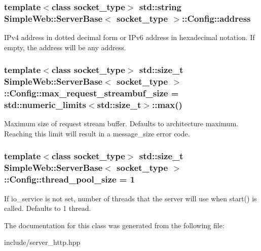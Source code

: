 \subsubsection[{\texorpdfstring{address}{address}}]{\setlength{\rightskip}{0pt plus 5cm}template$<$class socket\+\_\+type$>$ std\+::string {\bf Simple\+Web\+::\+Server\+Base}$<$ socket\+\_\+type $>$\+::Config\+::address}\hypertarget{classSimpleWeb_1_1ServerBase_1_1Config_add7a705aca3533bf0371708b19bb691c}{}\label{classSimpleWeb_1_1ServerBase_1_1Config_add7a705aca3533bf0371708b19bb691c}
I\+Pv4 address in dotted decimal form or I\+Pv6 address in hexadecimal notation. If empty, the address will be any address. 
\subsubsection[{\texorpdfstring{max\+\_\+request\+\_\+streambuf\+\_\+size}{max_request_streambuf_size}}]{\setlength{\rightskip}{0pt plus 5cm}template$<$class socket\+\_\+type$>$ std\+::size\+\_\+t {\bf Simple\+Web\+::\+Server\+Base}$<$ socket\+\_\+type $>$\+::Config\+::max\+\_\+request\+\_\+streambuf\+\_\+size = std\+::numeric\+\_\+limits$<$std\+::size\+\_\+t$>$\+::max()}\hypertarget{classSimpleWeb_1_1ServerBase_1_1Config_a81bd9a4816000009f3f6abee3400fb7a}{}\label{classSimpleWeb_1_1ServerBase_1_1Config_a81bd9a4816000009f3f6abee3400fb7a}
Maximum size of request stream buffer. Defaults to architecture maximum. Reaching this limit will result in a message\+\_\+size error code. 
\subsubsection[{\texorpdfstring{thread\+\_\+pool\+\_\+size}{thread_pool_size}}]{\setlength{\rightskip}{0pt plus 5cm}template$<$class socket\+\_\+type$>$ std\+::size\+\_\+t {\bf Simple\+Web\+::\+Server\+Base}$<$ socket\+\_\+type $>$\+::Config\+::thread\+\_\+pool\+\_\+size = 1}\hypertarget{classSimpleWeb_1_1ServerBase_1_1Config_a31ed6db903e42d6e2748d195de7b956b}{}\label{classSimpleWeb_1_1ServerBase_1_1Config_a31ed6db903e42d6e2748d195de7b956b}
If io\+\_\+service is not set, number of threads that the server will use when start() is called. Defaults to 1 thread. 

The documentation for this class was generated from the following file\+:\begin{DoxyCompactItemize}
\item 
include/server\+\_\+http.\+hpp\end{DoxyCompactItemize}
